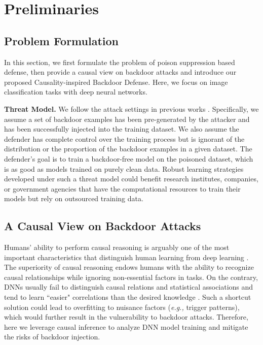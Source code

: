 \section{Preliminaries}
\subsection{Problem Formulation}
In this section, we first formulate the problem of poison suppression based defense, then provide a causal view on backdoor attacks and introduce our proposed Causality-inspired Backdoor Defense. Here, we focus on image classification tasks with deep neural networks.

\noindent\textbf{Threat Model. }We follow the attack settings in previous works \cite{li2021anti, backdoordecouple}. Specifically, we assume a set of backdoor examples has been pre-generated by the attacker and has been successfully injected into the training dataset. We also assume the defender has complete control over the training process but is ignorant of the distribution or the proportion of the backdoor examples in a given dataset. The defender’s goal is to train a backdoor-free model on the poisoned dataset, which is as good as models trained on purely clean data. Robust learning strategies developed under such a threat model could benefit research institutes, companies, or government agencies that have the computational resources to train their models but rely on outsourced training data.

\subsection{A Causal View on Backdoor Attacks}
Humans' ability to perform causal reasoning is arguably one of the most important characteristics that distinguish human learning from deep learning \cite{zhang2020causal, scholkopf2021toward}. The superiority of causal reasoning endows humans with the ability to recognize causal relationships while ignoring non-essential factors in tasks. On the contrary, DNNs usually fail to distinguish causal relations and statistical associations and tend to learn ``easier" correlations than the desired knowledge \cite{nam2020learning, geirhos2020shortcut}. Such a shortcut solution could lead to overfitting to nuisance factors (\emph{e.g.,} trigger patterns), which would further result in the vulnerability to backdoor attacks. Therefore, here we leverage causal inference to analyze DNN model training and mitigate the risks of backdoor injection. 

